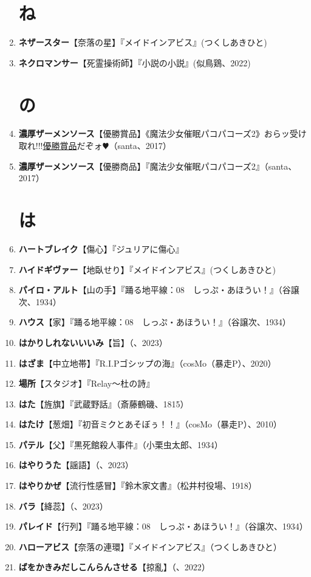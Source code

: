 \documentclass[twocolumn]{jsbook}
\newcommand{\ccite}[1]{《#1》}
\begin{document}
\begin{enumerate}
\section*{ね}
    \item \textbf{ネザースター}【奈落の星】『メイドインアビス』(つくしあきひと)
    \item \textbf{ネクロマンサー}【死霊操術師】『小説の小説』(似鳥鶏、2022)
\section*{の}
    \item \textbf{濃厚ザーメンソース}【優勝賞品】\ccite{魔法少女催眠パコパコーズ2}{おらッ受け取れ!!!\uline{優勝賞品}だぞォ$\varheartsuit$}（santa、2017）
    \item \textbf{濃厚ザーメンソース}【優勝商品】『魔法少女催眠パコパコーズ2』（santa、2017）
\section*{は}
    \item \textbf{ハートブレイク}【傷心】『ジュリアに傷心』
    \item \textbf{ハイドギヴァー}【地臥せり】『メイドインアビス』(つくしあきひと)
    \item \textbf{パイロ・アルト}【山の手】『踊る地平線：08　しっぷ・あほうい！』（谷譲次、1934）
    \item \textbf{ハウス}【家】『踊る地平線：08　しっぷ・あほうい！』（谷譲次、1934）
    \item \textbf{はかりしれないいいみ}【旨】（、2023）
    \item \textbf{はざま}【中立地帯】『R.I.Pゴシップの海』（cosMo（暴走P）、2020）
    \item \textbf{場所}【スタジオ】『Relay〜杜の詩』
    \item \textbf{はた}【旌旗】『武蔵野話』（斎藤鶴磯、1815）
    \item \textbf{はたけ}【葱畑】『初音ミクとあそぼぅ！！』（cosMo（暴走P）、2010）
    \item \textbf{パテル}【父】『黒死館殺人事件』（小栗虫太郎、1934）
    \item \textbf{はやりうた}【謡語】（、2023）
    \item \textbf{はやりかぜ}【流行性感冒】『鈴木家文書』（松井村役場、1918）
    \item \textbf{バラ}【絳蕊】（、2023）
    \item \textbf{パレイド}【行列】『踊る地平線：08　しっぷ・あほうい！』（谷譲次、1934）
    \item \textbf{ハローアビス}【奈落の連環】『メイドインアビス』（つくしあきひと）
    \item \textbf{ばをかきみだしこんらんさせる}【掠亂】（、2022）

\end{enumerate}
\end{document}
